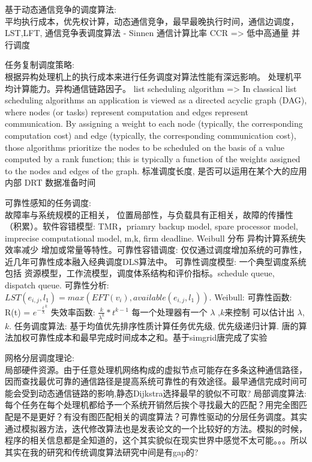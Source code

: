 \documentclass[UTF8]{article}
\begin{document}
基于动态通信竞争的调度算法:\\平均执行成本，优先权计算，动态通信竞争，最早最晚执行时间，通信边调度，LST,LFT, 通信竞争表调度算法 - Sinnen 通信计算比率 CCR => 低中高通量 并行调度 

任务复制调度策略: \\ \cite{zhao2003experimental} 根据异构处理机上的执行成本来进行任务调度对算法性能有深远影响。 处理机平均计算能力。异构通信链路因子。 list scheduling algorithm => In classical list scheduling algorithms an application is viewed as a directed acyclic graph (DAG), where nodes (or tasks) represent computation and edges represent communication. By assigning a weight to each node (typically, the corresponding computation cost) and edge (typically, the corresponding communication cost), those algorithms prioritize the nodes to be scheduled on the basis of a value computed by a rank function; this is typically a function of the weights assigned to the nodes and edges of the graph.  标准调度长度,  是否可以运用在某个大的应用内部 DRT 数据准备时间

可靠性感知的任务调度:\\ 故障率与系统规模的正相关， 位置局部性，与负载具有正相关，故障的传播性（积累）。软件容错模型: TMR，priamry backup model, spare processor model, imprecise computational model, m,k, firm deadline. Weibull 分布 异构计算系统失效率减少 增加或常量等特性。可靠性容错调度: 仅仅通过调度增加系统的可靠性，近几年可靠性成本融入经典调度DLS算法中。 可靠性调度模型: 一个典型调度系统包括 资源模型，工作流模型，调度体系结构和评价指标。schedule queue, dispatch queue. 可靠性分析: $LST(e_{i,j},l_1) = max(EFT(v_i), available(e_{i,j}, l_1))$. Weibull: 可靠性函数: R(t) = $e^{{-\frac{t}{\lambda}}^k}$ 失效率函数: $\frac{k}{\lambda^k}*t^{k - 1}$ 每一个处理器有一个 $\lambda$ ,$k$来控制 \cite{murthy2004weibull} 可以估计出 $\lambda$,$k$.  任务调度算法: 基于均值优先排序性质计算任务优先级, 优先级递归计算. 唐的算法加权可靠性成本和最早完成时间成本之和。基于simgrid唐完成了实验

网格分层调度理论:\\局部硬件资源。由于任意处理机网络构成的虚拟节点可能存在多条这种通信路径，因而查找最优可靠的通信路径是提高系统可靠性的有效途径。最早通信完成时间可能会受到动态通信链路的影响,静态Dijkstra选择最早的貌似不可取?  局部调度算法: 每个任务在每个处理机都给予一个系统开销然后挨个寻找最大的匹配？用完全图匹配是不是更好？有没有图匹配相关的调度算法？可靠性驱动的分层任务调度。其实通过模拟器方法，迭代修改算法也是发表论文的一个比较好的方法。模拟的时候，程序的相关信息都是全知道的，这个其实貌似在现实世界中感觉不太可能。。。所以其实在我的研究和传统调度算法研究中间是有gap的?
\end{document}
